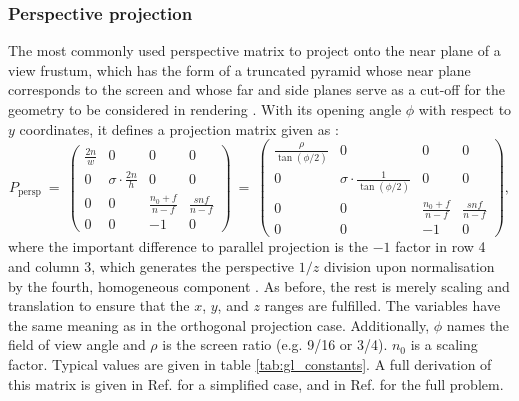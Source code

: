 \subsubsection{Perspective projection}
\label{sec:gl_perspective_proj}
The most commonly used perspective matrix to project onto the near plane of a view frustum, which
has the form of a truncated pyramid whose near plane corresponds to the screen and whose far and side
planes serve as a cut-off for the geometry to be considered in rendering \cite{web_gl_frustum}.
With its opening angle $\phi$ with respect to $y$ coordinates, it defines a projection matrix given as
\cite{web_gl_perspective} \cite{web_gl_frustum} \cite[p. 81]{Sellers2002}:
\begin{equation}
	P_{\mathrm{persp}} \ =\
		\left( \begin{array}{cccc}
			\frac{2n}{w} &                          0 &                  0 &  0                 \\
			           0 &  \sigma \cdot \frac{2n}{h} &                  0 &  0                 \\
			           0 &                          0 &  \frac{n_0+f}{n-f} &  \frac{s n f}{n-f} \\
			           0 &                          0 &         \boxed{-1} &  0
		\end{array} \right) \ = \
		\left( \begin{array}{cccc}
			\frac{\rho}{\tan\left(\phi/2 \right)} &                                                0 &                  0 &  0                 \\
			                                    0 &  \sigma \cdot \frac{1}{\tan\left(\phi/2 \right)} &                  0 &  0                 \\
			                                    0 &                                                0 &  \frac{n_0+f}{n-f} &  \frac{s n f}{n-f} \\
			                                    0 &                                                0 &         \boxed{-1} &  0
		\end{array} \right),
\end{equation}
where the important difference to parallel projection is the $-1$ factor in row 4 and column 3,
which generates the perspective $1/z$ division upon normalisation by the fourth,
homogeneous component \cite[pp. 350-351]{Kuipers2002}.
As before, the rest is merely scaling and translation to ensure that the $x$, $y$, and $z$ ranges
are fulfilled.
The variables have the same meaning as in the orthogonal projection case.
Additionally, $\phi$ names the field of view angle and $\rho$ is the screen ratio (e.g. 9/16 or 3/4).
$n_0$ is a scaling factor. Typical values are given in table \ref{tab:gl_constants}.
A full derivation of this matrix is given in Ref. \cite[pp. 350-351]{Kuipers2002}
for a simplified case, and in Ref. \cite{web_webgl_perspective} for the full
problem.


